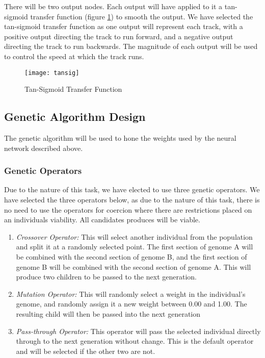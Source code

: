 
There will be two output nodes. Each output will have applied to it a tan-sigmoid transfer function (figure \ref{fig:tansig}) to smooth the output. We have selected the tan-sigmoid transfer function as one output will represent each track, with a positive output directing the track to run forward, and a negative output directing the track to run backwards. The magnitude of each output will be used to control the speed at which the track runs.

\begin{figure}[h]
	\begin{center}
		\texttt{[image: tansig]}
		\caption{Tan-Sigmoid Transfer Function}
		\label{fig:tansig}
	\end{center}
\end{figure}

\subsection{Genetic Algorithm Design}
\label{sec:GADesign}
The genetic algorithm will be used to hone the weights used by the neural network described above. 
\subsubsection{Genetic Operators}
Due to the nature of this task, we have elected to use three genetic operators. We have selected the three operators below, as due to the nature of this task, there is no need to use the operators for coercion where there are restrictions placed on an individuals viability. All candidates produces will be viable.
\begin{enumerate}
	\item \textit{Crossover Operator:} This will select another individual from the population and split it at a randomly selected point. The first section of genome A will be combined with the second section of genome B, and the first section of genome B will be combined with the second section of genome A. This will produce two children to be passed to the next generation.
	\item \textit{Mutation Operator:} This will randomly select a weight in the individual's genome, and randomly assign it a new weight between 0.00 and 1.00. The resulting child will then be passed into the next generation
	\item \textit{Pass-through Operator:} This operator will pass the selected individual directly through to the next generation without change. This is the default operator and will be selected if the other two are not.
\end{enumerate}

